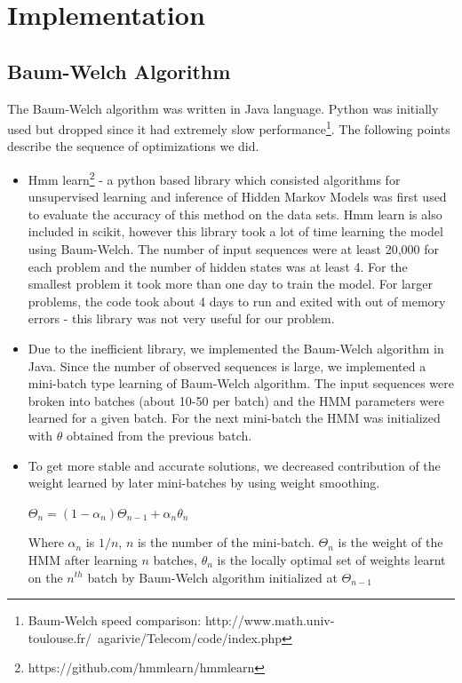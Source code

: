 \documentclass[letterpaper]{article}
\begin{document}
\section{Implementation}

\subsection{Baum-Welch Algorithm}

The Baum-Welch algorithm was written in Java language. Python was initially used but dropped since it had extremely slow performance\footnote{Baum-Welch speed comparison: http://www.math.univ-toulouse.fr/~agarivie/Telecom/code/index.php}. The following points describe the sequence of optimizations we did.

\begin{itemize}
\item Hmm learn\footnote{https://github.com/hmmlearn/hmmlearn} - a python based library which consisted algorithms for unsupervised learning and inference of Hidden Markov Models was first used to evaluate the accuracy of this method on the data sets. Hmm learn is also included in scikit, however this library took a lot of time learning the model using Baum-Welch. The number of input sequences were at least 20,000 for each problem and the number of hidden states was at least 4. For the smallest problem it took more than one day to train the model. For larger problems, the code took about 4 days to run and exited with out of memory errors - this library was not very useful for our problem.

\item Due to the inefficient library, we implemented the Baum-Welch algorithm in Java. Since the number of observed sequences is large, we implemented a mini-batch type learning of Baum-Welch algorithm. The input sequences were broken into batches (about 10-50 per batch) and the HMM parameters were learned for a given batch. For the next mini-batch the HMM was initialized with $\theta$ obtained from the previous batch.

\item To get more stable and accurate solutions, we decreased contribution of the weight learned by later mini-batches by using weight smoothing.

\begin{center}
$\Theta_{n} = (1-\alpha_{n})\Theta_{n-1} + \alpha_{n} \theta_{n}$
\end{center}

Where $\alpha_{n}$ is $1/n$, $n$ is the number of the mini-batch. $\Theta_{n}$ is the weight of the HMM after learning $n$ batches, $\theta_{n}$ is the locally optimal set of weights learnt on the $n^{th}$ batch by Baum-Welch algorithm initialized at $\Theta_{n-1}$ 



\end{itemize}
\end{document}
